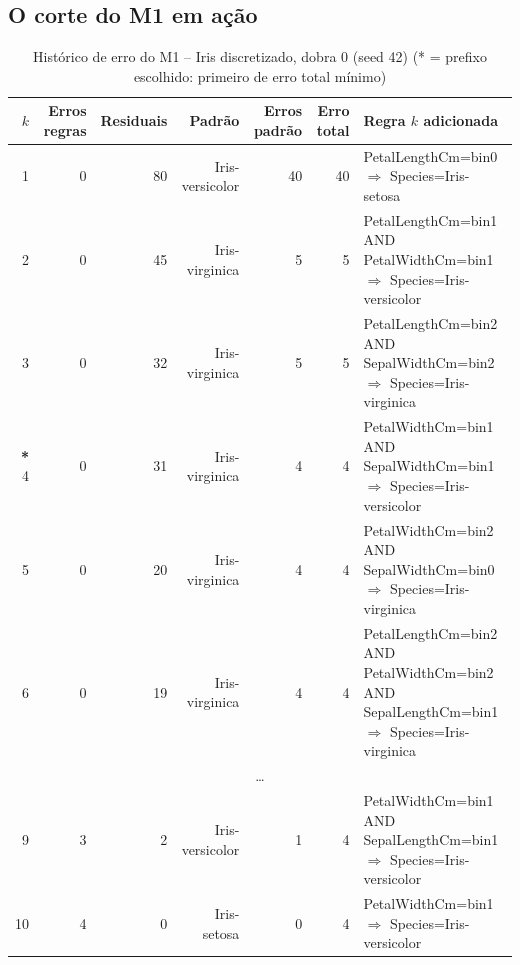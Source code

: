 \documentclass[a4paper,11pt]{article}
\begin{document}
\subsection{O corte do M1 em a\c{c}\~ao}\label{sec:m1}
\begin{table}[htbp]
\centering
\small
\caption{Histórico de erro do M1 -- Iris discretizado, dobra 0 (seed 42) (* = prefixo escolhido: primeiro de erro total mínimo)}
\label{tab:m1_iris}
\begin{tabular}{rrrrrrp{5.2cm}}
\toprule
$k$ & Erros regras & Residuais & Padrão & Erros padrão & Erro total & Regra $k$ adicionada \\
\midrule
1 & 0 & 80 & Iris-versicolor & 40 & 40 & PetalLengthCm=bin0 $\Rightarrow$ Species=Iris-setosa \\
2 & 0 & 45 & Iris-virginica & 5 & 5 & PetalLengthCm=bin1 AND PetalWidthCm=bin1 $\Rightarrow$ Species=Iris-versicolor \\
3 & 0 & 32 & Iris-virginica & 5 & 5 & PetalLengthCm=bin2 AND SepalWidthCm=bin2 $\Rightarrow$ Species=Iris-virginica \\
\textbf{*} 4 & 0 & 31 & Iris-virginica & 4 & 4 & PetalWidthCm=bin1 AND SepalWidthCm=bin1 $\Rightarrow$ Species=Iris-versicolor \\
5 & 0 & 20 & Iris-virginica & 4 & 4 & PetalWidthCm=bin2 AND SepalWidthCm=bin0 $\Rightarrow$ Species=Iris-virginica \\
6 & 0 & 19 & Iris-virginica & 4 & 4 & PetalLengthCm=bin2 AND PetalWidthCm=bin2 AND SepalLengthCm=bin1 $\Rightarrow$ Species=Iris-virginica \\
\multicolumn{7}{c}{\ldots} \\
9 & 3 & 2 & Iris-versicolor & 1 & 4 & PetalWidthCm=bin1 AND SepalLengthCm=bin1 $\Rightarrow$ Species=Iris-versicolor \\
10 & 4 & 0 & Iris-setosa & 0 & 4 & PetalWidthCm=bin1 $\Rightarrow$ Species=Iris-versicolor \\
\bottomrule
\end{tabular}
\end{table}
\end{document}
